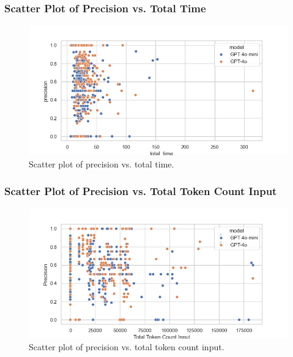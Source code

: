             \subsubsection{Scatter Plot of Precision vs. Total Time}
            \begin{figure}[H]
                \centering
                \includegraphics[scale=0.75]{images_exp2/precision/scatter_precision_vs_total_time.png}
                \caption{Scatter plot of precision vs. total time.}
                \label{fig:scatter_precision_vs_total_time}
            \end{figure}

            \subsubsection{Scatter Plot of Precision vs. Total Token Count Input}
            \begin{figure}[H]
                \centering
                \includegraphics[scale=0.75]{images_exp2/precision/scatter_precision_vs_total_token_count_input.png}
                \caption{Scatter plot of precision vs. total token count input.}
                \label{fig:scatter_precision_vs_total_token_count_input}
            \end{figure}

